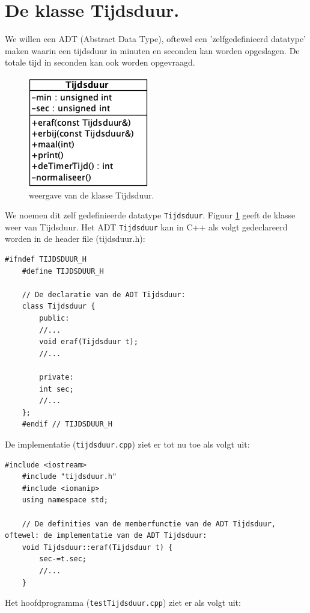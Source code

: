 \section{De klasse Tijdsduur.}

We willen een ADT (Abstract Data Type), oftewel een 'zelfgedefinieerd datatype' maken waarin een tijdsduur in minuten en seconden kan worden opgeslagen. De totale tijd in seconden kan ook worden opgevraagd. 
\begin{figure}[h!]
	\captionsetup{justification=centering}
	\includegraphics[width=0.28 \linewidth]{figuren/tijdsduur}
	\centering
	\caption{weergave van de klasse Tijdsduur. }
	\label{fig:tijdsduurKlas}
\end{figure}
We noemen dit zelf gedefinieerde datatype \texttt{Tijdsduur}. Figuur \ref{fig:tijdsduurKlas} geeft de klasse weer van Tijdsduur.
Het ADT \texttt{Tijdsduur} kan in C++ als volgt gedeclareerd worden in de header file (tijdsduur.h):

\begin{lstlisting}[caption= de headerfile van de klasse \texttt{Tijdsduur},label={lst:tijdsdHeader},numbers=none]		
	#ifndef TIJDSDUUR_H
	#define TIJDSDUUR_H
	
	// De declaratie van de ADT Tijdsduur:
	class Tijdsduur {
		public:
		//...
		void eraf(Tijdsduur t);
		//...
		
		private:
		int sec;
		//...
	};
	#endif // TIJDSDUUR_H
\end{lstlisting}
\newpage
De implementatie (\texttt{tijdsduur.cpp}) ziet er tot nu toe als volgt uit:
\begin{lstlisting}[caption= de implementatiefile van de klasse \texttt{Tijdsduur},label={lst:tijdsdImpl},numbers=none]
	#include <iostream>
	#include "tijdsduur.h"
	#include <iomanip>
	using namespace std;
	
	// De definities van de memberfunctie van de ADT Tijdsduur, oftewel: de implementatie van de ADT Tijdsduur:
	void Tijdsduur::eraf(Tijdsduur t) {
		sec-=t.sec;
		//...
	}
\end{lstlisting}

Het hoofdprogramma (\texttt{testTijdsduur.cpp}) ziet er als volgt uit:

